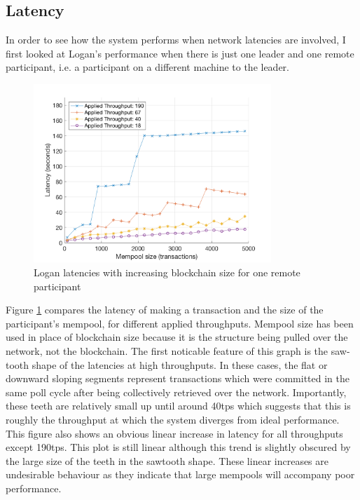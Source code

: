 \documentclass[12pt,a4paper,twoside,openright]{report}
\begin{document}
	\subsection{Latency}
	In order to see how the system performs when network latencies are involved, I first looked at Logan's performance when there is just one leader and one remote participant, i.e. a participant on a different machine to the leader.
	\begin{figure}
		\centering
		\includegraphics[width=0.8\textwidth]{figs/latencies_sizes_throughputs.png}
		\caption{Logan latencies with increasing blockchain size for one remote participant}
		\label{figs:remlatencysize}
	\end{figure} 
	Figure \ref{figs:remlatencysize} compares the latency of making a transaction and the size of the participant's mempool, for different applied throughputs.
	Mempool size has been used in place of blockchain size because it is the structure being pulled over the network, not the blockchain.
	The first noticable feature of this graph is the saw-tooth shape of the latencies at high throughputs.
	In these cases, the flat or downward sloping segments represent transactions which were committed in the same poll cycle after being collectively retrieved over the network.
	Importantly, these teeth are relatively small up until around 40tps which suggests that this is roughly the throughput at which the system diverges from ideal performance.
	This figure also shows an obvious linear increase in latency for all throughputs except 190tps. 
	This plot is still linear although this trend is slightly obscured by the large size of the teeth in the sawtooth shape.
	These linear increases are undesirable behaviour as they indicate that large mempools will accompany poor performance.\\
	
\end{document}
